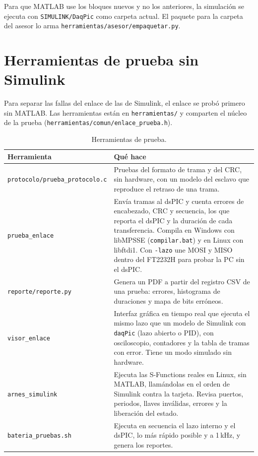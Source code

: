 \documentclass[11pt]{article}
\newcommand{\code}[1]{\texttt{#1}}
\begin{document}
Para que MATLAB use los bloques nuevos y no los anteriores, la simulación se
ejecuta con \code{SIMULINK/DaqPic} como carpeta actual. El paquete para la
carpeta del asesor lo arma \code{herramientas/\allowbreak asesor/\allowbreak empaquetar.py}.

\section{Herramientas de prueba sin Simulink}

Para separar las fallas del enlace de las de Simulink, el enlace se probó
primero sin MATLAB. Las herramientas están en \code{herramientas/} y comparten
el núcleo de la prueba (\code{herramientas/\allowbreak comun/\allowbreak enlace\_prueba.h}).

\begin{table}[H]
\centering
\small
\begin{tabularx}{\linewidth}{@{}lY@{}}
\toprule
Herramienta & Qué hace \\
\midrule
\code{protocolo/prueba\_protocolo.c} & Pruebas del formato de trama y del
  CRC, sin hardware, con un modelo del esclavo que reproduce el retraso de una
  trama. \\
\addlinespace
\code{prueba\_enlace} & Envía tramas al dsPIC y cuenta errores de encabezado,
  CRC y secuencia, los que reporta el dsPIC y la duración de cada
  transferencia. Compila en Windows con libMPSSE (\code{compilar.bat}) y en
  Linux con libftdi1. Con \code{-lazo} une MOSI y MISO dentro del FT2232H para
  probar la PC sin el dsPIC. \\
\addlinespace
\code{reporte/reporte.py} & Genera un PDF a partir del registro CSV de una
  prueba: errores, histograma de duraciones y mapa de bits erróneos. \\
\addlinespace
\code{visor\_enlace} & Interfaz gráfica en tiempo real que ejecuta el mismo
  lazo que un modelo de Simulink con \code{daqPic} (lazo abierto o PID), con
  osciloscopio, contadores y la tabla de tramas con error. Tiene un modo
  simulado sin hardware. \\
\addlinespace
\code{arnes\_simulink} & Ejecuta las S-Functions reales en Linux, sin MATLAB,
  llamándolas en el orden de Simulink contra la tarjeta. Revisa puertos,
  periodos, llaves inválidas, errores y la liberación del estado. \\
\addlinespace
\code{bateria\_pruebas.sh} & Ejecuta en secuencia el lazo interno y el dsPIC,
  lo más rápido posible y a 1\,kHz, y genera los reportes. \\
\bottomrule
\end{tabularx}
\caption{Herramientas de prueba.}
\label{tab:herramientas}
\end{table}
\end{document}
